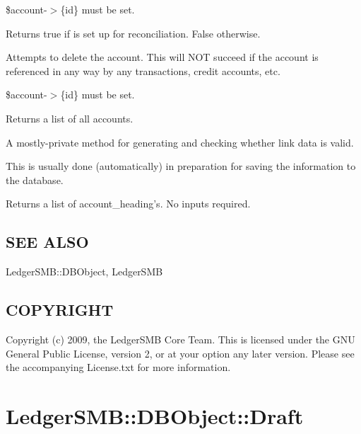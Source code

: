 \begin{description}
\begin{description}
\begin{description}
\begin{description}
\begin{description}
\begin{description}
\begin{description}
\begin{description}
\begin{description}
\begin{description}
\$account-$>$\{id\} must be set.


\item[{is\_recon}] \mbox{}

Returns true if is set up for reconciliation.  False otherwise.


\item[{delete()}] \mbox{}

Attempts to delete the account.  This will NOT succeed if the account is
referenced in any way by any transactions, credit accounts, etc.



\$account-$>$\{id\} must be set.


\item[{list()}] \mbox{}

Returns a list of all accounts.


\item[{generate\_links()}] \mbox{}

A mostly-private method for generating and checking whether link data is valid.



This is usually done (automatically) in preparation for saving the information 
to the database.


\item[{list\_headings}] \mbox{}

Returns a list of account\_heading's.  No inputs required.

\end{description}
\subsection*{SEE ALSO\label{LedgerSMB::DBObject::Account_SEE_ALSO}}


LedgerSMB::DBObject, LedgerSMB

\subsection*{COPYRIGHT\label{LedgerSMB::DBObject::Account_COPYRIGHT}}


Copyright (c) 2009, the LedgerSMB Core Team.  This is licensed under the GNU 
General Public License, version 2, or at your option any later version.  Please 
see the accompanying License.txt for more information.

\section{LedgerSMB::DBObject::Draft\label{LedgerSMB::DBObject::Draft}}



\end{description}
\end{description}
\end{description}
\end{description}
\end{description}
\end{description}
\end{description}
\end{description}
\end{description}
